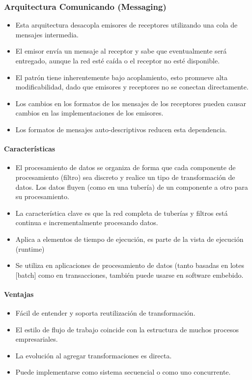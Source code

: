 \subsubsection{Arquitectura Comunicando (Messaging)}
\begin{itemize}
	\item Esta arquitectura desacopla emisores de receptores utilizando una cola
de mensajes intermedia.
	\item El emisor envía un mensaje al receptor y sabe que eventualmente será entregado, aunque la red esté caída o el receptor no esté disponible.
	\item El patrón tiene inherentemente bajo acoplamiento, esto promueve alta modificabilidad, dado que emisores y receptores no se conectan directamente.
	\item Los cambios en los formatos de los mensajes de los receptores pueden causar cambios en las implementaciones de los emisores.
	\item Los formatos de mensajes auto-descriptivos reducen esta dependencia.
\end{itemize}
\paragraph{Características}
\begin{itemize}
	\item El procesamiento de datos se organiza de forma que cada componente de procesamiento (filtro) sea discreto y realice un tipo de transformación de datos. Los datos fluyen (como en una tubería) de un componente a otro para su procesamiento.
	\item La característica clave es que la red completa de tuberías y filtros está continua e incrementalmente procesando datos.
	\item Aplica a elementos de tiempo de ejecución, es parte de la vista de ejecución (runtime)
	\item Se utiliza en aplicaciones de procesamiento de datos (tanto basadas en lotes [batch] como en transacciones, también puede usarse en software embebido.
\end{itemize}
\paragraph{Ventajas}
\begin{itemize}
	\item Fácil de entender y soporta reutilización de transformación.
	\item El estilo de flujo de trabajo coincide con la estructura de muchos procesos empresariales.
	\item La evolución al agregar transformaciones es directa.
	\item Puede implementarse como sistema secuencial o como uno concurrente.
\end{itemize}
